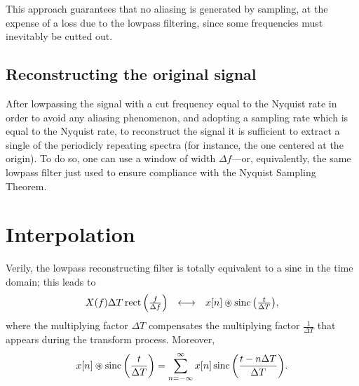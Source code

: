 \documentclass[\documentfontsize, twocolumn]{\classname}
\begin{document}
\begin{center}
\end{center}

This approach guarantees that no aliasing is generated by sampling, at the expense of a loss due to the lowpass filtering, since some frequencies must inevitably be cutted out.

\subsection{Reconstructing the original signal}

After lowpassing the signal with a cut frequency equal to the Nyquist rate in order to avoid any aliasing phenomenon, and adopting a sampling rate which is equal to the Nyquist rate, to reconstruct the signal it is sufficient to extract a single of the periodicly repeating spectra (for instance, the one centered at the origin). To do so, one can use a window of width $\Delta f$---or, equivalently, the same lowpass filter just used to ensure compliance with the Nyquist Sampling Theorem.

\section{Interpolation}

Verily, the lowpass reconstructing filter is totally equivalent to a $\operatorname{sinc}$ in the time domain; this leads to
\[
    \begin{array}{rcl}
        X(f)\Delta T \operatorname{rect}{\left(\frac f {\Delta f}\right)} & \longleftrightarrow & x[n] \circledast \operatorname{sinc}{\left(\frac t {\Delta T}\right)},
    \end{array}
\]
where the multiplying factor $\Delta T$ compensates the multiplying factor $\frac{1}{\Delta T}$ that appears during the transform process. Moreover,
\[
    x[n] \circledast \operatorname{sinc}{\left(\frac t {\Delta T}\right)} = \sum_{n=-\infty}^\infty x[n] \operatorname{sinc}{\left(\frac{t - n\Delta T}{\Delta T}\right)}.
\]
\end{document}
